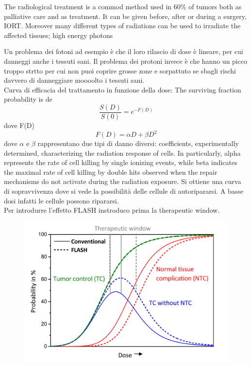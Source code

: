         The radiological treatment is a commod method used in 60\% of tumors both as palliative care and as treatment. It can be given before, after or during a surgery,  IORT. 
        Moreover many different types of radiations can be used to irradiate the affected tissues; high energy photons 

    Un problema dei fotoni ad esempio è che il loro rilascio di dose è lineare, per cui danneggi anche i tessuti sani. Il problema dei protoni invece è che hanno un picco troppo strtto per cui non puoi coprire grosse zone e sorpattuto se sbagli rischi davvero di danneggiare moooolto i tessuti sani.\\

    Curva di efficacia del trattamento in funzione della dose:
    The surviving fraction probability is de
    \begin{equation}
        \frac{S(D)}{S(0)}=e^{-F(D)}
    \end{equation} 
    dove F(D)   
    \begin{equation}
        F(D) = \alpha D + \beta D^2
    \end{equation} 
    dove $\alpha$ e $\beta$ rappresentano due tipi di danno diversi: coefficients, experimentally determined, characterizing the
    radiation response of cells. In particularly, alpha represents the rate of cell killing
    by single ionizing events, while beta indicates the maximal rate of cell killing by
    double hits observed when the repair mechanisms do not activate during the
    radiation exposure.
    Si ottiene una curva di sopravvivenza dove si vede la possibilità delle cellule di autoripararsi. A basse dosi infatti le cellule possono ripararsi.\\

    Per introdurre l'effetto FLASH instroduco prima la therapeutic window.  \\

    \begin{figure}
        \centering
        \includegraphics[width=.8\linewidth]{figures/pixel_detectors_usage/curve_flash.png}
        \caption{}
        \label{fig:}
     \end{figure}
    
